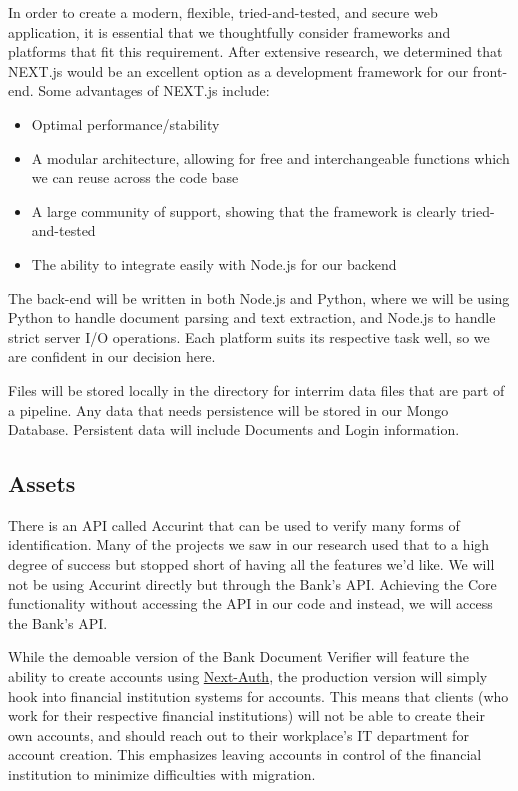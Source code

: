 In order to create a modern, flexible, tried-and-tested, and secure web application, it is essential that we thoughtfully consider frameworks and platforms that fit this requirement. After extensive research, we determined that NEXT.js would be an excellent option as a development framework for our front-end. Some advantages of NEXT.js include: 

\begin{itemize}
    \item Optimal performance/stability
    \item A modular architecture, allowing for free and interchangeable functions which we can reuse across the code base
    \item A large community of support, showing that the framework is clearly tried-and-tested
    \item The ability to integrate easily with Node.js for our backend
\end{itemize}

The back-end will be written in both Node.js and Python, where we will be using Python to handle document parsing and text extraction, and Node.js to handle strict server I/O operations. Each platform suits its respective task well, so we are confident in our decision here.

Files will be stored locally in the directory for interrim data files that are part of a pipeline. Any data that needs persistence will be stored in our Mongo Database. Persistent data will include Documents and Login information.

\subsection{Assets}

There is an API called Accurint that can be used to verify many forms of identification. Many of the projects we saw in our research used that to a high degree of success but stopped short of having all the features we’d like. We will not be using Accurint directly but through the Bank's API. Achieving the Core functionality without accessing the API in our code and instead, we will access the Bank's API.

While the demoable version of the Bank Document Verifier will feature the ability to create accounts using \href{https://next-auth.js.org/}{Next-Auth}, the production version will simply hook into financial institution systems for accounts. This means that clients (who work for their respective financial institutions) will not be able to create their own accounts, and should reach out to their workplace's IT department for account creation. This emphasizes leaving accounts in control of the financial institution to minimize difficulties with migration.


